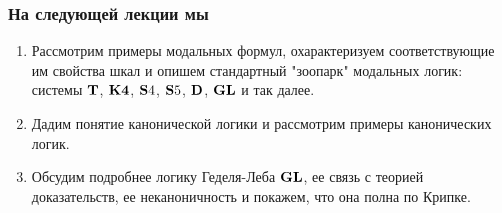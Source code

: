 \documentclass[pdf,utf8,russian,aspectratio=169]{beamer}
\begin{document}
\begin{frame}
  \frametitle{На следующей лекции мы}

  \begin{enumerate}
    \item Рассмотрим примеры модальных формул, охарактеризуем соответствующие им свойства шкал и опишем стандартный "зоопарк"
    модальных логик: системы ${\bf T}$, ${\bf K4}$, ${\bf S}4$, ${\bf S}5$, ${\bf D}$, ${\bf GL}$ и так далее.
    \item Дадим понятие канонической логики и рассмотрим примеры канонических логик.
    \item Обсудим подробнее логику Геделя-Леба ${\bf GL}$, ее связь с теорией доказательств, ее неканоничность и покажем, что она полна по Крипке.
  \end{enumerate}
\end{frame}
\end{document}
